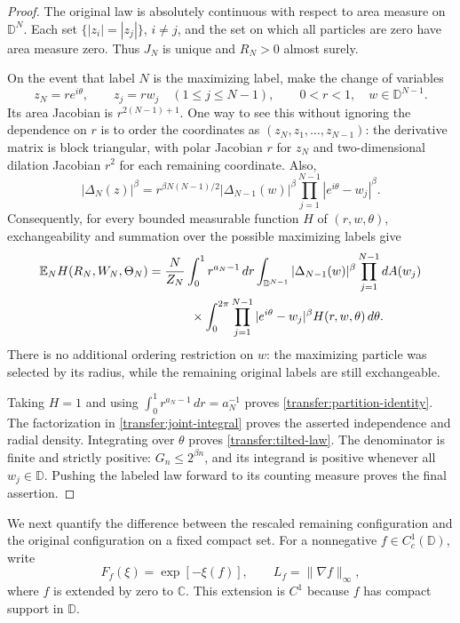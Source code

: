 \documentclass[11pt,a4paper]{article}
\numberwithin{equation}{section}
\theoremstyle{definition}
\theoremstyle{remark}
\newcommand{\D}{\mathbb D}
\newcommand{\E}{\mathbb E}
\newcommand{\C}{\mathbb C}
\begin{document}
\begin{proof}
The original law is absolutely continuous with respect to area measure
on $\D^N$. Each set $\{|z_i|=|z_j|\}$, $i\ne j$, and the set on
which all particles are zero have area measure zero. Thus $J_N$ is
unique and $R_N>0$ almost surely.

On the event that label $N$ is the maximizing label, make the change of
variables
\[
 z_N=re^{i\theta},\qquad z_j=rw_j\quad(1\le j\le N-1),
 \qquad 0<r<1,\quad w\in\D^{N-1}.
\]
Its area Jacobian is $r^{2(N-1)+1}$. One way to see this without
ignoring the dependence on $r$ is to order the coordinates as
$(z_N,z_1,\ldots,z_{N-1})$: the derivative matrix is block triangular,
with polar Jacobian $r$ for $z_N$ and two-dimensional dilation
Jacobian $r^2$ for each remaining coordinate. Also,
\[
 |\Delta_N(z)|^\beta
 =r^{\beta N(N-1)/2}|\Delta_{N-1}(w)|^\beta
   \prod_{j=1}^{N-1}|e^{i\theta}-w_j|^\beta.
\]
Consequently, for every bounded measurable function $H$ of
$(r,w,\theta)$, exchangeability and summation over the possible
maximizing labels give
\begin{align}
 \E_N H(R_N,W_N,\Theta_N)
 &=\frac{N}{Z_N}\int_0^1 r^{a_N-1}\,dr
   \int_{\D^{N-1}}|\Delta_{N-1}(w)|^\beta
       \prod_{j=1}^{N-1}dA(w_j)\notag\\
 &\hspace{12mm}\times
   \int_0^{2\pi}\prod_{j=1}^{N-1}|e^{i\theta}-w_j|^\beta
       H(r,w,\theta)\,d\theta.
 \label{transfer:joint-integral}
\end{align}
There is no additional ordering restriction on $w$: the maximizing
particle was selected by its radius, while the remaining original
labels are still exchangeable.

Taking $H=1$ and using $\int_0^1r^{a_N-1}\,dr=a_N^{-1}$ proves
\eqref{transfer:partition-identity}. The factorization in
\eqref{transfer:joint-integral} proves the asserted independence and
radial density. Integrating over $\theta$ proves
\eqref{transfer:tilted-law}. The denominator is finite and strictly
positive: $G_n\le2^{\beta n}$, and its integrand is positive whenever
all $w_j\in\D$. Pushing the labeled law forward to its counting
measure proves the final assertion.
\end{proof}

We next quantify the difference between the rescaled remaining
configuration and the original configuration on a fixed compact set.
For a nonnegative $f\in C_c^1(\D)$, write
\[
 F_f(\xi)=\exp[-\xi(f)],\qquad L_f=\|\nabla f\|_\infty,
\]
where $f$ is extended by zero to $\C$. This extension is $C^1$ because
$f$ has compact support in $\D$.
\end{document}
